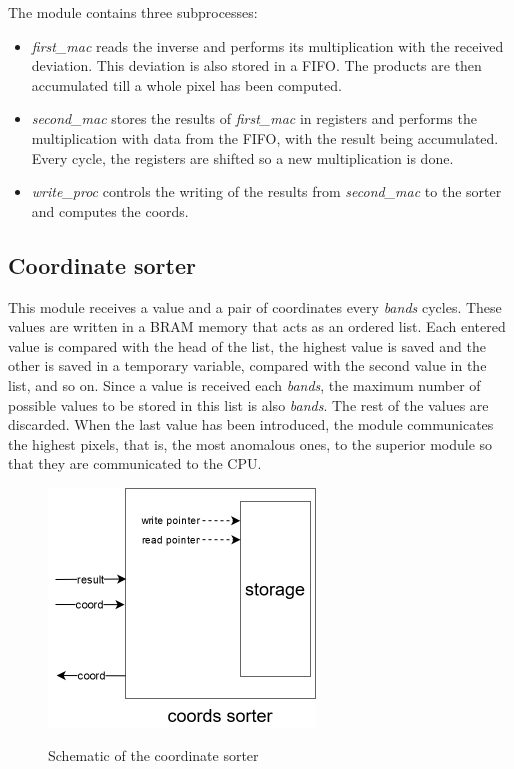 The module contains three subprocesses:
\begin{itemize}
	\item \emph{first\_mac} reads the inverse and performs its multiplication with the received deviation. This deviation is also stored in a FIFO. The products are then accumulated till a whole pixel has been computed.
	\item \emph{second\_mac} stores the results of \emph{first\_mac} in registers and performs the multiplication with data from the FIFO, with the result being accumulated. Every cycle, the registers are shifted so a new multiplication is done.
	\item \emph{write\_proc} controls the writing of the results from \emph{second\_mac} to the sorter and computes the coords.
\end{itemize}



\subsection{Coordinate sorter}
This module receives a value and a pair of coordinates every \textit{bands} cycles. These values are written in a BRAM memory that acts as an ordered list. Each entered value is compared with the head of the list, the highest value is saved and the other is saved in a temporary variable, compared with the second value in the list, and so on. Since a value is received each \textit{bands}, the maximum number of possible values to be stored in this list is also \textit{bands}. The rest of the values are discarded. When the last value has been introduced, the module communicates the highest pixels, that is, the most anomalous ones, to the superior module so that they are communicated to the CPU.

\begin{figure}[h!]
\centering\textbf{
\includegraphics[height=2.5in]{figures/sort.png}}
\caption{Schematic of the coordinate sorter}
  \label{fig:sorter}
\end{figure}
